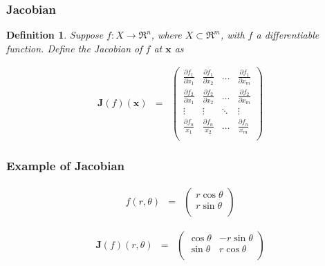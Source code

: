 \documentclass{beamer}
\newtheorem{defn}{Definition}
\numberwithin{equation}{section}
\begin{document}
\begin{frame}
\frametitle{Jacobian}

\begin{defn}
Suppose $f:X \rightarrow \Re^{n}$, where $X \subset \Re^{m}$, with $f$ a differentiable function.   Define the \alert{Jacobian} of $f$ at $\boldsymbol{x}$ as 

\begin{eqnarray}
\boldsymbol{J}(f)(\boldsymbol{x} ) & = & \begin{pmatrix}
\frac{\partial f_{1}}{\partial x_{1} } & \frac{\partial f_{1}}{\partial x_{2} } & \hdots & \frac{\partial f_{1}} {\partial x_{m} } \\
\frac{\partial f_{2}}{\partial x_{1} } & \frac{\partial f_{2}}{\partial x_{2} } & \hdots & \frac{\partial f_{2}} {\partial x_{m} } \\
\vdots & \vdots & \ddots & \vdots \\
\frac{\partial f_{n} }{x_{1} } & \frac{\partial f_{n} } {x_{2} } & \hdots & \frac{\partial f_{n} } {x_{m} } \\
\end{pmatrix} \nonumber 
\end{eqnarray}

\end{defn}


\end{frame}


\begin{frame}
\frametitle{Example of Jacobian}

\begin{eqnarray}
f(r, \theta) & = & \begin{pmatrix} 
r \cos \theta \\
r \sin \theta\\
\end{pmatrix} \nonumber 
\end{eqnarray}

\begin{eqnarray}
\boldsymbol{J}(f)(r, \theta) & = & 
\begin{pmatrix}
\cos \theta & - r \sin \theta  \\
\sin \theta &  r \cos \theta \\
\end{pmatrix} \nonumber 
\end{eqnarray}



\end{frame}
\end{document}
